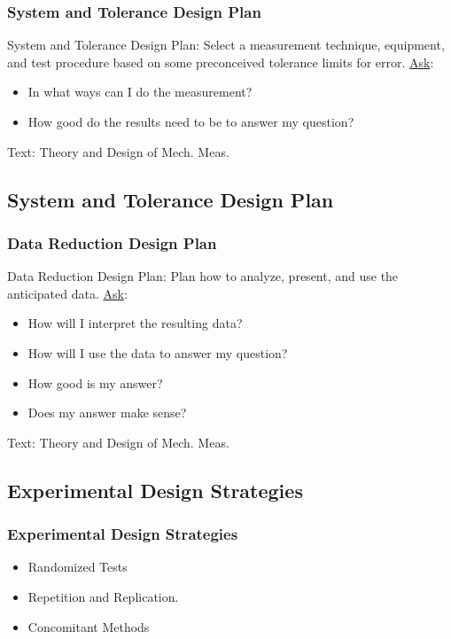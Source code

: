 \documentclass[fleqn]{beamer} %
\newcommand{\sectionIIIsubsectionIItitle}{System and Tolerance Design Plan}
\newcommand{\sectionIIIsubsectionIIItitle}{Data Reduction Design Plan}
\newcommand{\sectionIIIsubsectionIVtitle}{Experimental Design Strategies}
\begin{document}
			\begin{frame}
				\frametitle{\sectionIIIsubsectionIItitle}

				{\PR System and Tolerance Design Plan}: Select a measurement technique, equipment, and
				test procedure based on some preconceived tolerance limits for error. \vspc
				\underline{Ask}:
				\begin{itemize}
				\item In what ways can I do the measurement?
				\item How good do the results need to be to answer my
				question? 
				\end{itemize} 

				{\tiny Text: Theory and Design of Mech. Meas.}
			\end{frame}

		\subsection{\sectionIIIsubsectionIItitle}\label{sectionIIIsubsectionIII}

			\begin{frame}
				\frametitle{\sectionIIIsubsectionIIItitle}

				{\GR Data Reduction Design Plan}: Plan how to analyze, present, and use the anticipated data.\vspc
				\underline{Ask}:
				\begin{itemize}
				\item How will I interpret the resulting data?
				\item How will I use the data to answer my question?
				\item How good is my answer? 
				\item Does my answer make sense?
				\end{itemize} 

				{\tiny Text: Theory and Design of Mech. Meas.}
			\end{frame}

		\subsection{\sectionIIIsubsectionIVtitle}\label{sectionIIIsubsectionIV}	

			\begin{frame}
				\frametitle{\sectionIIIsubsectionIVtitle}

				\begin{itemize}
					\item {\BL Randomized} Tests \vspccc%
					\item {\GR Repetition} and {\PR Replication}. \vspccc%
					\item {\BR Concomitant} Methods \vspccc
				\end{itemize}

			\end{frame}
	
\end{document}
